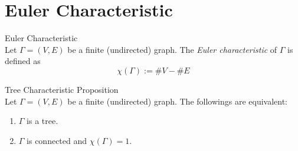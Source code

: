 \section{Euler Characteristic}

\begin{definition}{Euler Characteristic}\\
Let $\Gamma = (V,E)$ be a finite (undirected) graph. The \textit{Euler characteristic} of $\Gamma$ is defined as
$$\chi (\Gamma) := \# V-\# E$$
\end{definition}

\begin{proposition}{Tree Characteristic Proposition}\\
Let $\Gamma=(V,E)$ be a finite (undirected) graph. The followings are equivalent:
\begin{enumerate}
    \item $\Gamma$ is a tree.
    \item $\Gamma$ is connected and $\chi (\Gamma) =1$.
\end{enumerate}
\end{proposition}

